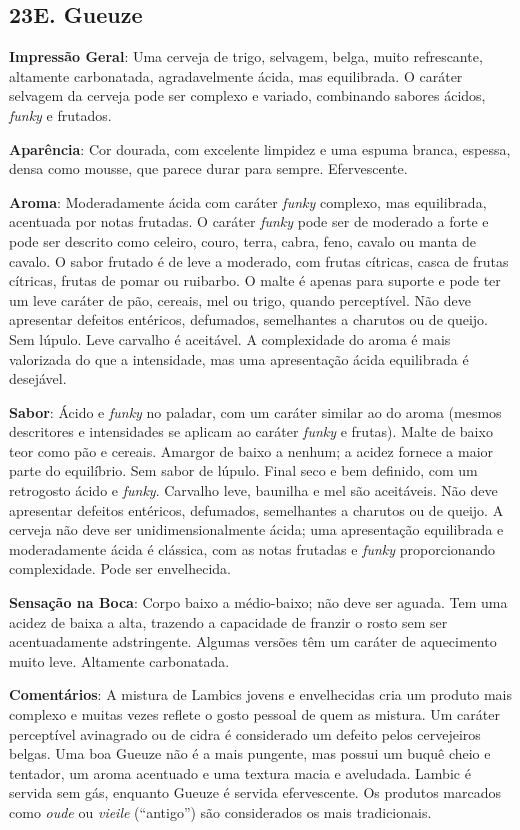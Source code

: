 \subsection*{23E. Gueuze}
\textbf{Impressão Geral}: Uma cerveja de trigo, selvagem, belga, muito refrescante, altamente carbonatada, agradavelmente ácida, mas equilibrada. O caráter selvagem da cerveja pode ser complexo e variado, combinando sabores ácidos, \textit{funky} e frutados.

\textbf{Aparência}: Cor dourada, com excelente limpidez e uma espuma branca, espessa, densa como mousse, que parece durar para sempre. Efervescente.

\textbf{Aroma}: Moderadamente ácida com caráter \textit{funky} complexo, mas equilibrada, acentuada por notas frutadas. O caráter \textit{funky} pode ser de moderado a forte e pode ser descrito como celeiro, couro, terra, cabra, feno, cavalo ou manta de cavalo. O sabor frutado é de leve a moderado, com frutas cítricas, casca de frutas cítricas, frutas de pomar ou ruibarbo. O malte é apenas para suporte e pode ter um leve caráter de pão, cereais, mel ou trigo, quando perceptível. Não deve apresentar defeitos entéricos, defumados, semelhantes a charutos ou de queijo. Sem lúpulo. Leve carvalho é aceitável. A complexidade do aroma é mais valorizada do que a intensidade, mas uma apresentação ácida equilibrada é desejável.

\textbf{Sabor}: Ácido e \textit{funky} no paladar, com um caráter similar ao do aroma (mesmos descritores e intensidades se aplicam ao caráter \textit{funky} e frutas). Malte de baixo teor como pão e cereais. Amargor de baixo a nenhum; a acidez fornece a maior parte do equilíbrio. Sem sabor de lúpulo. Final seco e bem definido, com um retrogosto ácido e \textit{funky}. Carvalho leve, baunilha e mel são aceitáveis. Não deve apresentar defeitos entéricos, defumados, semelhantes a charutos ou de queijo. A cerveja não deve ser unidimensionalmente ácida; uma apresentação equilibrada e moderadamente ácida é clássica, com as notas frutadas e \textit{funky} proporcionando complexidade. Pode ser envelhecida.

\textbf{Sensação na Boca}: Corpo baixo a médio-baixo; não deve ser aguada. Tem uma acidez de baixa a alta, trazendo a capacidade de franzir o rosto sem ser acentuadamente adstringente. Algumas versões têm um caráter de aquecimento muito leve. Altamente carbonatada.

\textbf{Comentários}: A mistura de Lambics jovens e envelhecidas cria um produto mais complexo e muitas vezes reflete o gosto pessoal de quem as mistura. Um caráter perceptível avinagrado ou de cidra é considerado um defeito pelos cervejeiros belgas. Uma boa Gueuze não é a mais pungente, mas possui um buquê cheio e tentador, um aroma acentuado e uma textura macia e aveludada. Lambic é servida sem gás, enquanto Gueuze é servida efervescente. Os produtos marcados como \textit{oude} ou \textit{vieile} (“antigo”) são considerados os mais tradicionais.


